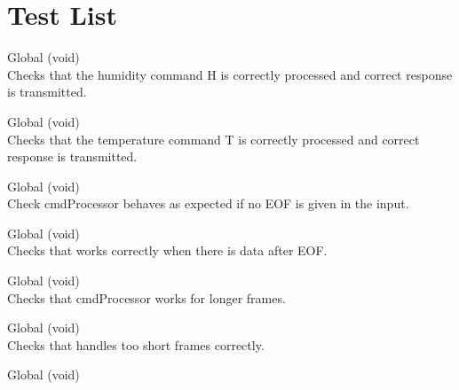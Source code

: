\chapter{Test List}
\hypertarget{test}{}\label{test}

\begin{DoxyRefList}
\item[Global \doxylink{test__runner_8c_a0e34650844c48eec8327f44ea729ad32}{test\+\_\+cmd\+H\+\_\+valid} (void)]\hfill \\
\label{test__test000003}%
%
Checks that the humidity command \textquotesingle{}H\textquotesingle{} is correctly processed and correct response is transmitted.  
\item[Global \doxylink{test__runner_8c_aa8e3960392299e8daa08a3e440969f18}{test\+\_\+cmd\+T\+\_\+valid} (void)]\hfill \\
\label{test__test000002}%
%
Checks that the temperature command \textquotesingle{}T\textquotesingle{} is correctly processed and correct response is transmitted.  
\item[Global \doxylink{test__runner_8c_a18710f9616a96f27d6c58f5a737305d4}{test\+\_\+\+EOF\+\_\+missing} (void)]\hfill \\
\label{test__test000008}%
%
Check cmd\+Processor behaves as expected if no EOF is given in the input.  
\item[Global \doxylink{test__runner_8c_ac45069250bbc3c5541450426cd1fa839}{test\+\_\+\+EOF\+\_\+overflow} (void)]\hfill \\
\label{test__test000009}%
%
Checks that  works correctly when there is data after EOF.  
\item[Global \doxylink{test__runner_8c_aa3911409d83b51cbe726f35ea712fae2}{test\+\_\+frame\+\_\+too\+\_\+long} (void)]\hfill \\
\label{test__test000011}%
%
Checks that cmd\+Processor works for longer frames.  
\item[Global \doxylink{test__runner_8c_ae49de573360424c16decb24250b5095a}{test\+\_\+frame\+\_\+too\+\_\+short} (void)]\hfill \\
\label{test__test000010}%
%
Checks that  handles too short frames correctly.  
\item[Global \doxylink{test__runner_8c_a38473a901a9966e048ab1b8352c56c21}{test\+\_\+invalid\+Case} (void)]\hfill \\

\end{DoxyRefList}

